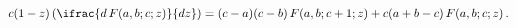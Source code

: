 \[c(1-z)\left(\ifrac{d\mathop{F\/}\nolimits\!\left(a,b;c;z\right)}{dz}\right)=(c%
-a)(c-b)\mathop{F\/}\nolimits\!\left(a,b;c+1;z\right)+c(a+b-c)\mathop{F\/}%
\nolimits\!\left(a,b;c;z\right).\]